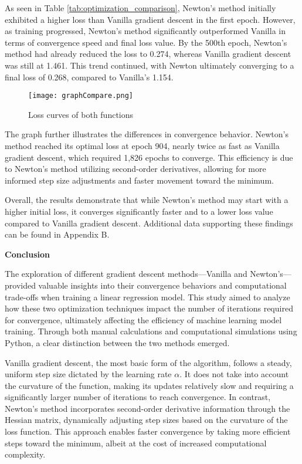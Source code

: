 \documentclass[12pt]{article}
\theoremstyle{definition}
\begin{document}
As seen in Table \ref{tab:optimization_comparison}, Newton’s method initially exhibited a higher loss than Vanilla gradient descent in the first epoch. However, as training progressed, Newton’s method significantly outperformed Vanilla in terms of convergence speed and final loss value. By the 500th epoch, Newton’s method had already reduced the loss to 0.274, whereas Vanilla gradient descent was still at 1.461. This trend continued, with Newton ultimately converging to a final loss of 0.268, compared to Vanilla’s 1.154.

\begin{figure}[h]
    \centering
    \texttt{[image: graphCompare.png]}
    \caption{Loss curves of both functions}
    \label{fig:enter-label}
\end{figure}

The graph further illustrates the differences in convergence behavior. Newton’s method reached its optimal loss at epoch 904, nearly twice as fast as Vanilla gradient descent, which required 1,826 epochs to converge. This efficiency is due to Newton’s method utilizing second-order derivatives, allowing for more informed step size adjustments and faster movement toward the minimum.

Overall, the results demonstrate that while Newton’s method may start with a higher initial loss, it converges significantly faster and to a lower loss value compared to Vanilla gradient descent. Additional data supporting these findings can be found in Appendix B.

\break
\begin{flushleft}
\textbf{Conclusion}
\end{flushleft}

The exploration of different gradient descent methods—Vanilla and Newton’s—provided valuable insights into their convergence behaviors and computational trade-offs when training a linear regression model. This study aimed to analyze how these two optimization techniques impact the number of iterations required for convergence, ultimately affecting the efficiency of machine learning model training. Through both manual calculations and computational simulations using Python, a clear distinction between the two methods emerged.

Vanilla gradient descent, the most basic form of the algorithm, follows a steady, uniform step size dictated by the learning rate $\alpha$. It does not take into account the curvature of the function, making its updates relatively slow and requiring a significantly larger number of iterations to reach convergence. In contrast, Newton’s method incorporates second-order derivative information through the Hessian matrix, dynamically adjusting step sizes based on the curvature of the loss function. This approach enables faster convergence by taking more efficient steps toward the minimum, albeit at the cost of increased computational complexity.
\end{document}
